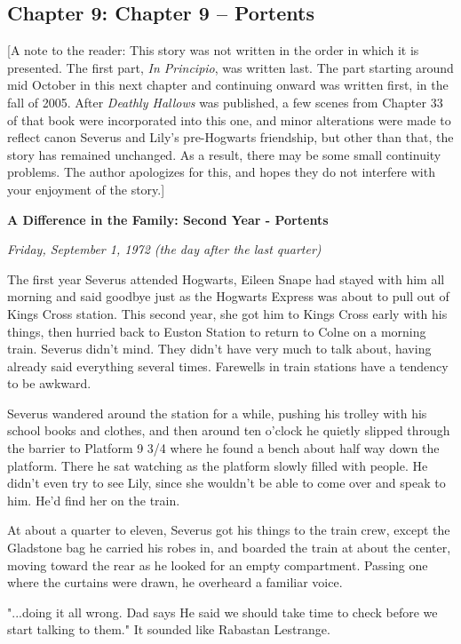 \documentclass[a4paper,11pt]{article}
\begin{document}
\subsection{Chapter 9: Chapter 9 – Portents}

[A note to the reader: This story was not written in the order in which it is presented. The first part, \emph{In Principio}, was written last. The part starting around mid October in this next chapter and continuing onward was written first, in the fall of 2005. After \emph{Deathly Hallows} was published, a few scenes from Chapter 33 of that book were incorporated into this one, and minor alterations were made to reflect canon Severus and Lily's pre-Hogwarts friendship, but other than that, the story has remained unchanged. As a result, there may be some small continuity problems. The author apologizes for this, and hopes they do not interfere with your enjoyment of the story.]

\textbf{A Difference in the Family: Second Year - Portents}

\emph{Friday, September 1, 1972 (the day after the last quarter)}

The first year Severus attended Hogwarts, Eileen Snape had stayed with him all morning and said goodbye just as the Hogwarts Express was about to pull out of Kings Cross station. This second year, she got him to Kings Cross early with his things, then hurried back to Euston Station to return to Colne on a morning train. Severus didn't mind. They didn't have very much to talk about, having already said everything several times. Farewells in train stations have a tendency to be awkward.

Severus wandered around the station for a while, pushing his trolley with his school books and clothes, and then around ten o'clock he quietly slipped through the barrier to Platform 9 3/4 where he found a bench about half way down the platform. There he sat watching as the platform slowly filled with people. He didn't even try to see Lily, since she wouldn't be able to come over and speak to him. He'd find her on the train.

At about a quarter to eleven, Severus got his things to the train crew, except the Gladstone bag he carried his robes in, and boarded the train at about the center, moving toward the rear as he looked for an empty compartment. Passing one where the curtains were drawn, he overheard a familiar voice.

"...doing it all wrong. Dad says He said we should take time to check before we start talking to them." It sounded like Rabastan Lestrange.
\end{document}

